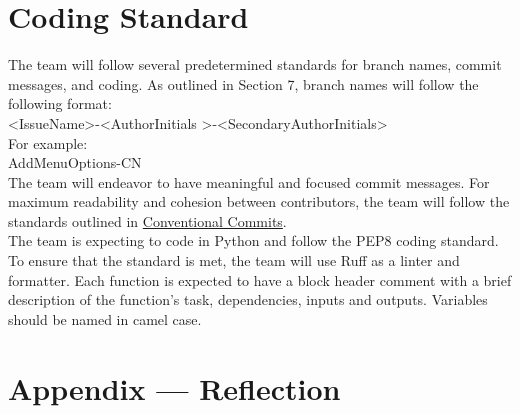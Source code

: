 \documentclass{article}
\begin{document}

\section{Coding Standard}

The team will follow several predetermined standards for branch names, commit messages, and coding. As outlined in Section 7, branch names will follow the following format:  \\

\textless Issue\textunderscore Name\textgreater-\textless AuthorInitials \textgreater-\textless SecondaryAuthorInitials\textgreater \\

For example:  \\

Add\textunderscore Menu\textunderscore Options-CN \\

The team will endeavor to have meaningful and focused commit messages. For maximum readability and cohesion between contributors, the team will follow the standards outlined in 
\href{https://www.conventionalcommits.org/en/v1.0.0/} {Conventional Commits}.  \\

The team is expecting to code in Python and follow the PEP8 coding standard. To ensure that the standard is met, the team will use Ruff as a linter and formatter. Each function is expected to have a block header comment with a brief description of the function’s task, dependencies, inputs and outputs. Variables should be named in camel case.  \\

\newpage{}

\section*{Appendix --- Reflection}
\end{document}
